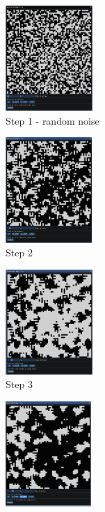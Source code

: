 \documentclass[12pt]{report}
\begin{document}
\begin{figure}[ht!]
	\centering
	\begin{subfigure}[t]{0.3\textwidth}
		\centering
		\includegraphics[height=4cm]{images/s_1}
		\caption{Step 1 - random noise} 
	\end{subfigure} \hspace{1em}
	\begin{subfigure}[t]{0.3\textwidth}
		\centering
		\includegraphics[height=4cm]{images/s_2}
		\caption{Step 2} 
	\end{subfigure} \hspace{1em}
	\begin{subfigure}[t]{0.3\textwidth}
		\centering
		\includegraphics[height=4cm]{images/s_3}
		\caption{Step 3} 
	\end{subfigure} \hspace{1em}
	\begin{subfigure}[t]{0.3\textwidth}
		\centering
		\includegraphics[height=4cm]{images/s_4}

\end{subfigure}
\end{figure}
\end{document}
